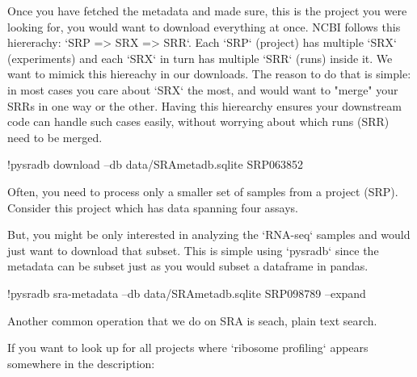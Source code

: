 \documentclass[9pt,a4paper]{extarticle}
\newenvironment{allintypewriter}{\ttfamily}{\par}
\begin{document}
Once you have fetched the metadata and made sure, this is the project you were 
looking for, you would want to download everything at once. NCBI follows this 
hiererachy: `SRP => SRX => SRR`. Each `SRP` (project) has multiple `SRX` 
(experiments) and each `SRX` in turn has multiple `SRR` (runs) inside it.
We want to mimick this hiereachy in our downloads. The reason to do that is simple:
in most cases you care about `SRX` the most, and would want to "merge" your SRRs
in one way or the other. Having this hierearchy ensures your downstream code
can handle such cases easily, without worrying about which runs (SRR) need to
be merged.


\begin{allintypewriter}
!pysradb download --db data/SRAmetadb.sqlite SRP063852 
\end{allintypewriter}

Often, you need to process only a smaller set of samples from a project (SRP).
Consider this project which has data spanning four assays.


But, you might be only interested in analyzing the `RNA-seq` samples and would 
just want to download that subset. This is simple using `pysradb` since the
metadata can be subset just as you would subset a dataframe in pandas.



\begin{allintypewriter}
!pysradb sra-metadata --db data/SRAmetadb.sqlite  SRP098789 --expand
\end{allintypewriter}


Another common operation that we do on SRA is seach, plain text search.


If you want to look up for all projects where `ribosome profiling` appears somewhere
in the description:
\end{document}
